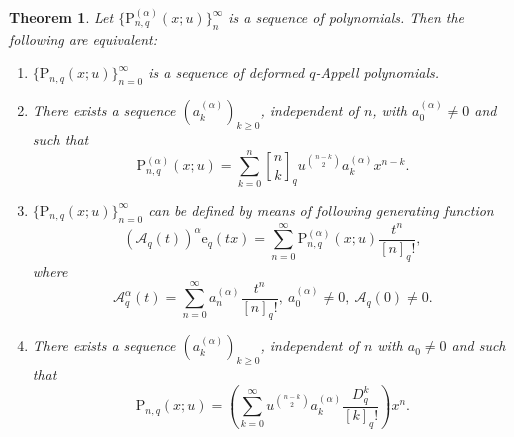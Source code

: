 \documentclass[12pt]{article}
\newcommand{\qbinom}{\genfrac{[}{]}{0pt}{}}
\newcommand{\e}{\mathrm{e}}
\newcommand{\A}{\mathcal{A}}
\newcommand{\p}{\mathrm{P}}
\newtheorem{theorem}{Theorem}
\begin{document}
\begin{theorem}\label{theo-charac}
Let $\{\p_{n,q}^{(\alpha)}(x;u)\}_{n}^{\infty}$ is a sequence of polynomials. Then the following are equivalent:
\begin{enumerate}
    \item $\{\p_{n,q}(x;u)\}_{n=0}^{\infty}$ is a sequence of deformed $q$-Appell polynomials.
    \item There exists a sequence $(a_{k}^{(\alpha)})_{k\geq0}$, independent of $n$, with $a_{0}^{(\alpha)}\neq0$ and such that
    \begin{equation*}
        \p_{n,q}^{(\alpha)}(x;u)=\sum_{k=0}^{n}\qbinom{n}{k}_{q}u^{\binom{n-k}{2}}a_{k}^{(\alpha)}x^{n-k}.
    \end{equation*}
    \item $\{\p_{n,q}(x;u)\}_{n=0}^{\infty}$ can be defined by means of following generating function 
    \begin{equation*}
        (\A_{q}(t))^{\alpha}\e_{q}(tx)=\sum_{n=0}^{\infty}\p_{n,q}^{(\alpha)}(x;u)\frac{t^n}{[n]_{q}!},
    \end{equation*}
    where 
    \begin{equation*}
        \A_{q}^{\alpha}(t)=\sum_{n=0}^{\infty}a_{n}^{(\alpha)}\frac{t^n}{[n]_{q}!},\ a_{0}^{(\alpha)}\neq0,\ \A_{q}(0)\neq0.
    \end{equation*}
    \item There exists a sequence $(a_{k}^{(\alpha)})_{k\geq0}$, independent of $n$ with $a_{0}\neq0$ and such that
    \begin{equation*}
        \p_{n,q}(x;u)=\left(\sum_{k=0}^{\infty}u^{\binom{n-k}{2}}a_{k}^{(\alpha)}\frac{D_{q}^{k}}{[k]_{q}!}\right)x^n.
    \end{equation*}
\end{enumerate}
\end{theorem}
\end{document}
